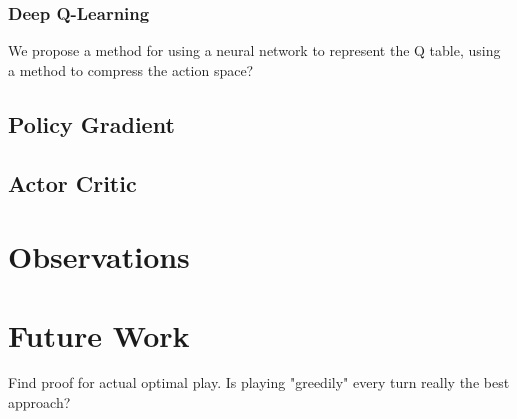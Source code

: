 \documentclass{article}
\theoremstyle{plain}
\theoremstyle{definition}
\theoremstyle{remark}
\begin{document}
\subsubsection{Deep Q-Learning}
We propose a method for using a neural network to represent the Q table, using a method to compress the action space?

\subsection{Policy Gradient}
\subsection{Actor Critic}


\section{Observations}
\section{Future Work}
Find proof for actual optimal play. Is playing "greedily" every turn really the best approach?
\end{document}

